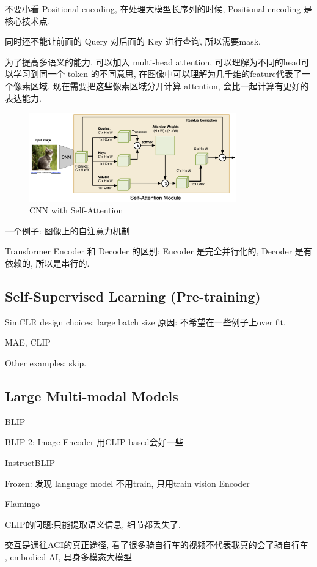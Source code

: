 不要小看 Positional encoding, 在处理大模型长序列的时候, Positional encoding 是核心技术点.

同时还不能让前面的 Query 对后面的 Key 进行查询, 所以需要mask.

为了提高多语义的能力, 可以加入 multi-head attention, 可以理解为不同的head可以学习到同一个 token 的不同意思,
在图像中可以理解为几千维的feature代表了一个像素区域, 现在需要把这些像素区域分开计算 attention, 会比一起计算有更好的表达能力.

\begin{figure}[htbp]
    \centering
    \includegraphics[width=0.8\textwidth]{figures/image_self_atten.png}
    \caption{CNN with Self-Attention}
    \label{fig:image_self_atten}
\end{figure}

一个例子: 图像上的自注意力机制

Transformer Encoder 和 Decoder 的区别: Encoder 是完全并行化的, Decoder 是有依赖的, 所以是串行的.

\subsection{Self-Supervised Learning (Pre-training)}

SimCLR design choices: large batch size 原因: 不希望在一些例子上over fit.

MAE, CLIP

Other examples: skip.

\subsection{Large Multi-modal Models}

BLIP

BLIP-2: Image Encoder 用CLIP based会好一些

InstructBLIP

Frozen: 发现 language model 不用train, 只用train vision Encoder

Flamingo

CLIP的问题:只能提取语义信息, 细节都丢失了.

交互是通往AGI的真正途径, 看了很多骑自行车的视频不代表我真的会了骑自行车
, embodied AI, 具身多模态大模型